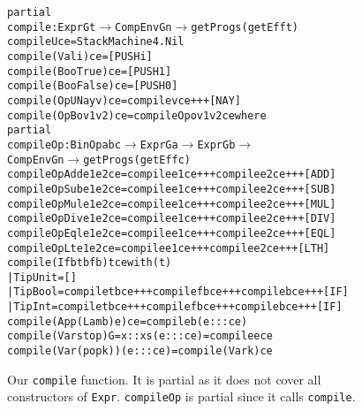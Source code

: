 \begin{figure}
\begin{alltt}
partial
compile : Expr G t \(\to\) CompEnv G n \(\to\) getProg s (getEff t)
compile U                 ce    = StackMachine4.Nil
compile (Val i)           ce    = [PUSH i]
compile (Boo True)        ce    = [PUSH 1]
compile (Boo False)       ce    = [PUSH 0]
compile (OpU Nay v)       ce    = compile v ce +++ [NAY]
compile (OpB o v1 v2) ce = compileOp o v1 v2 ce where
  partial 
  compileOp : BinOp a b c \(\to\) Expr G a \(\to\) Expr G b \(\to\) 
              CompEnv G n \(\to\) getProg s (getEff c)
  compileOp Add e1 e2 ce = compile e1 ce +++ compile e2 ce +++ [ADD]
  compileOp Sub e1 e2 ce = compile e1 ce +++ compile e2 ce +++ [SUB]
  compileOp Mul e1 e2 ce = compile e1 ce +++ compile e2 ce +++ [MUL]
  compileOp Div e1 e2 ce = compile e1 ce +++ compile e2 ce +++ [DIV]
  compileOp Eql e1 e2 ce = compile e1 ce +++ compile e2 ce +++ [EQL]
  compileOp Lt  e1 e2 ce = compile e1 ce +++ compile e2 ce +++ [LTH]
compile (If b tb fb) {t} ce with (t)
  | TipUnit = []
  | TipBool = compile tb ce +++ compile fb ce +++ compile b ce +++ [IF]
  | TipInt  = compile tb ce +++ compile fb ce +++ compile b ce +++ [IF]
compile (App (Lam b) e) ce = compile b (e ::: ce)
compile (Var stop) {G = x :: xs} (e ::: ce) = compile e ce
compile (Var (pop k)) (e ::: ce) = compile (Var k) ce
\end{alltt}
\label{fig:compile_function}
\caption{Our \texttt{compile} function. It is partial as it does not cover all constructors of \texttt{Expr}. \texttt{compileOp} is partial since it calls \texttt{compile}.}
\end{figure}
